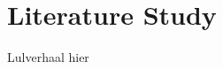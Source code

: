 \documentclass[class=article, crop=false]{standalone}
\begin{document}
\section{Literature Study}
Lulverhaal hier
\end{document}
